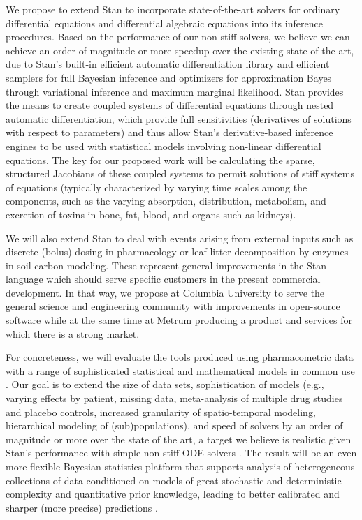 \documentclass[11pt]{article}
\begin{document}
We propose to extend Stan to incorporate state-of-the-art solvers for
ordinary differential equations and differential algebraic equations
into its inference procedures.  Based on the performance of our
non-stiff solvers, we believe we can achieve an order of magnitude or
more speedup over the existing state-of-the-art, due to Stan's
built-in efficient automatic differentiation library and efficient
samplers for full Bayesian inference and optimizers for approximation
Bayes through variational inference and maximum marginal likelihood.
Stan provides the means to create coupled systems of differential
equations through nested automatic differentiation, which provide full
sensitivities (derivatives of solutions with respect to parameters)
\cite{lee-hovland:2002,serban-hindmarsh:2003,carpenter-et-al:2015} and
thus allow Stan's derivative-based inference engines to be used with
statistical models involving non-linear differential equations.  The
key for our proposed work will be calculating the sparse, structured
Jacobians of these coupled systems to permit solutions of stiff
systems of equations (typically characterized by varying time scales
among the components, such as the varying absorption, distribution,
metabolism, and excretion of toxins in bone, fat, blood, and organs
such as kidneys).

We will also extend Stan to deal with events arising from external
inputs such as discrete (bolus) dosing in pharmacology or leaf-litter
decomposition by enzymes in soil-carbon modeling. These represent
general improvements in the Stan language which should serve specific
customers in the present commercial development.  In that way, we
propose at Columbia University to serve the general science and
engineering community with improvements in open-source software while
at the same time at Metrum producing a product and services for which
there is a strong market.

For concreteness, we will evaluate the tools produced using
pharmacometric data with a range of sophisticated statistical and
mathematical models in common use \citep[e.g.,][]{ette-williams:2007,
  schmidt-derendorf:2014}. Our goal is to extend the size of data
sets, sophistication of models (e.g., varying effects by patient,
missing data, meta-analysis of multiple drug studies and placebo
controls, increased granularity of spatio-temporal modeling,
hierarchical modeling of (sub)populations), and speed of solvers by an
order of magnitude or more over the state of the art, a target we
believe is realistic given Stan's performance with simple non-stiff
ODE solvers \cite{weber-et-al:2014}.  The result will be an even more
flexible Bayesian statistics platform that supports analysis of
heterogeneous collections of data conditioned on models of great
stochastic and deterministic complexity and quantitative prior
knowledge, leading to better calibrated and sharper (more precise)
predictions \citep[see, e.g.,][]{gneiting-et-al:2007}.
\end{document}
